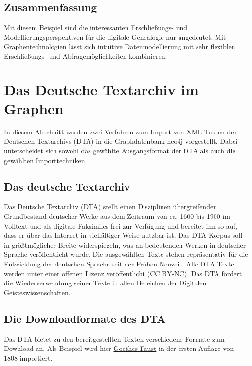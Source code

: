 \documentclass[ngerman,]{scrreprt}
\begin{document}
\section{Zusammenfassung}\label{zusammenfassung-3}

Mit diesem Beispiel sind die interessanten Erschließungs- und Modellierungsperspektiven für die digitale Genealogie nur angedeutet. Mit Graphentechnologien lässt sich intuitive Datenmodellierung mit sehr flexiblen Erschließungs- und Abfragemöglichkeiten kombinieren.

\chapter{Das Deutsche Textarchiv im Graphen}\label{das-deutsche-textarchiv-im-graphen}

In diesem Abschnitt werden zwei Verfahren zum Import von XML-Texten des Deutschen Textarchivs (DTA) in die Graphdatenbank neo4j vorgestellt. Dabei unterscheidet sich sowohl das gewählte Ausgangsformat der DTA als auch die gewählten Importtechniken.

\section{Das deutsche Textarchiv}\label{das-deutsche-textarchiv}

Das Deutsche Textarchiv (DTA) stellt einen Disziplinen übergreifenden Grundbestand deutscher Werke aus dem Zeitraum von ca. 1600 bis 1900 im Volltext und als digitale Faksimiles frei zur Verfügung und bereitet ihn so auf, dass er über das Internet in vielfältiger Weise nutzbar ist. Das DTA-Korpus soll in größtmöglicher Breite widerspiegeln, was an bedeutenden Werken in deutscher Sprache veröffentlicht wurde. Die ausgewählten Texte stehen repräsentativ für die Entwicklung der deutschen Sprache seit der Frühen Neuzeit. Alle DTA-Texte werden unter einer offenen Lizenz veröffentlicht (CC BY-NC). Das DTA fördert die Wiederverwendung seiner Texte in allen Bereichen der Digitalen Geisteswissenschaften.

\section{Die Downloadformate des DTA}\label{die-downloadformate-des-dta}

Das DTA bietet zu den bereitgestellten Texten verschiedene Formate zum Download an. Als Beispiel wird hier \href{http://deutschestextarchiv.de/book/show/goethe_faust01_1808}{Goethes Faust} in der ersten Auflage von 1808 importiert.
\end{document}
